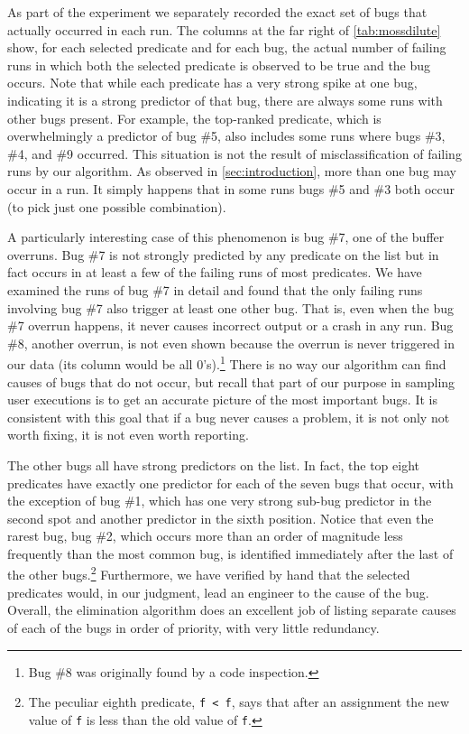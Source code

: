 As part of the experiment we separately recorded the exact set of
bugs that actually occurred in each run.
The columns at the far right of \autoref{tab:mossdilute} show, for
each selected predicate and for each bug, the actual number of failing
runs in which both the selected predicate is observed to be true and
the bug occurs.
Note that while each
predicate has a very strong spike at one bug, indicating it is a
strong predictor of that bug, there are always some runs with other
bugs present.  For example, the top-ranked predicate, which is
overwhelmingly a predictor of bug \#5, also includes some runs where
bugs \#3, \#4, and \#9 occurred.  This situation is not the result of
misclassification of failing runs by our algorithm.  As observed in
\autoref{sec:introduction}, more than one bug may occur in a run.
It simply happens that in some runs bugs \#5 and \#3 both occur (to
pick just one possible combination).

A particularly interesting case of this phenomenon is bug \#7, one of
the buffer overruns.  Bug \#7 is not strongly predicted by any
predicate on the list but in fact occurs in at least a few of the
failing runs of most predicates.  We have examined the runs of bug \#7
in detail and found that the only failing runs involving bug \#7 also
trigger at least one other bug.  That is, even when the bug \#7 overrun
happens, it never causes incorrect output or a crash
in any run.  Bug \#8, another overrun, is not even shown because the
overrun is never triggered in our data (its column would be all
0's).\footnote{Bug \#8 was originally found by a code inspection.}
There is no way our algorithm can find causes of bugs that do not
occur, but recall that part of our purpose in sampling user executions
is to get an accurate picture of the most important bugs.  It is
consistent with this goal that if a bug never causes a problem, it is
not only not worth fixing, it is not even worth reporting.

The other bugs all have strong predictors on the list.  In fact,
the top eight predicates have exactly one predictor for each of the seven
bugs that occur, with the exception of bug \#1, which has one very
strong sub-bug predictor in the second spot and another predictor
in the sixth position.  Notice that even the rarest bug, bug \#2,
which occurs more than an order of magnitude less frequently than
the most common bug, is identified immediately after the last of
the other bugs.\footnote{The peculiar eighth predicate, \texttt{f < f},
says that after an assignment the new value of \texttt{f} is less than
the old value of \texttt{f}.}  Furthermore, we have verified by hand that
the selected predicates would, in our judgment, lead an engineer to
the cause of the bug. Overall, the elimination algorithm does an excellent
job of listing separate causes of each of the bugs in order of priority,
with very little redundancy.

